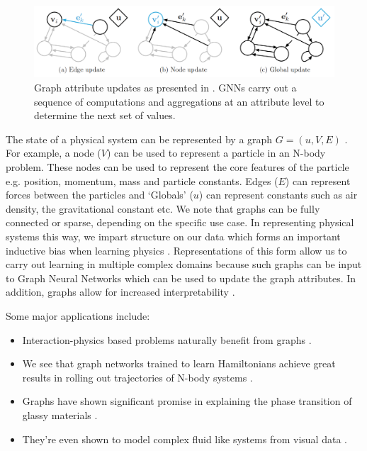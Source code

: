 \documentclass{article}
\begin{document}
\begin{figure}[h]
\centering
\includegraphics[width=\textwidth]{figures/1graph.png}
\caption{Graph attribute updates as presented in \cite{battaglia_relational_2018}. GNNs carry out a sequence of computations and aggregations at an attribute level to determine the next set of values.}
\label{fig:gnn}
\end{figure}
The state of a physical system can be represented by a graph $G = (u,V,E)$ \cite{battaglia_relational_2018}. For example, a node ($V$) can be used to represent a particle in an N-body problem. These nodes can be used to represent the core features of the particle e.g. position, momentum, mass and particle constants. Edges ($E$) can represent forces between the particles and `Globals' ($u$) can represent constants such as air density, the gravitational constant etc. We note that graphs can be fully connected or sparse, depending on the specific use case. In representing physical systems this way, we impart structure on our data which forms an important inductive bias when learning physics \cite{battaglia_interaction_2016, battaglia_relational_2018, sanchez-gonzalez_graph_2018,seo_differentiable_2019,cranmer_learning_2019, seo_physics-aware_2020, sanchez-gonzalez_learning_2020,lamb_graph_2020,cranmer_lagrangian_2020}. Representations of this form allow us to carry out learning in multiple complex domains because such graphs can be input to Graph Neural Networks which can be used to update the graph attributes. In addition, graphs allow for increased interpretability \cite{battaglia_relational_2018}.

Some major applications include:
\begin{itemize}
\item Interaction-physics based problems naturally benefit from graphs \cite{battaglia_relational_2018}. 
\item We see that graph networks trained to learn Hamiltonians achieve great results in rolling out trajectories of N-body systems \cite{sanchez-gonzalez_hamiltonian_2019}. 
\item Graphs have shown significant promise in explaining the phase transition of glassy materials \cite{bapst_unveiling_2020}. 
\item They're even shown to model complex fluid like systems from visual data \cite{sanchez-gonzalez_learning_2020}. 
\end{itemize}
\end{document}
